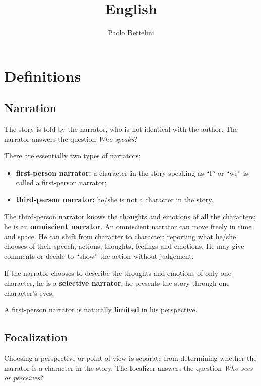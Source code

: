 \documentclass[a4paper]{article}
\title{English}
\author{Paolo Bettelini}
\date{}
\newcommand{\quotes}[1]{``#1''}
\begin{document}
\maketitle
\tableofcontents
\pagebreak

\section{Definitions}

\subsection{Narration}

The story is told by the narrator, who is not identical with the author. The narrator answers the
question \textit{Who speaks}?

There are essentially two types of narrators:
\begin{itemize}
    \item \textbf{first-person narrator:}
        a character in the story speaking as “I” or “we” is called a first-person
        narrator;
    \item \textbf{third-person narrator:}
        he/she is not a character in the story.
\end{itemize}

The third-person narrator knows the thoughts and emotions of all the characters; he is an
\textbf{omniscient narrator}. An omniscient narrator can move freely in time and space. He can shift from
character to character; reporting what he/she chooses of their speech, actions, thoughts, feelings
and emotions. He may give comments or decide to \quotes{show} the action without judgement.

If the narrator chooses to describe the thoughts and emotions of only one character, he is a \textbf{selective
narrator}: he presents the story through one character's eyes.

A first-person narrator is naturally \textbf{limited} in his perspective.

\subsection{Focalization}

Choosing a perspective or point of view is separate from determining whether the narrator is a
character in the story. The focalizer answers the question \textit{Who sees or perceives}?
\end{document}
